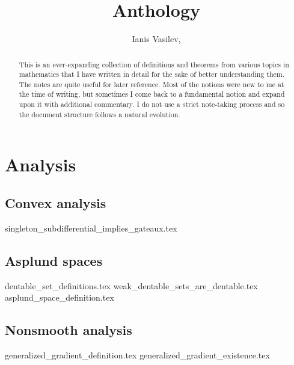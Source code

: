 \documentclass[numbers=endperiod, bibliography=totocnumbered]{scrartcl}
\title{Anthology}
\author{Ianis Vasilev, \Email{ianis@ivasilev.net}}
\date{}
\begin{document}
\maketitle

\begin{abstract}
  This is an ever-expanding collection of definitions and theorems from various topics in mathematics that I have written in detail for the sake of better understanding them. The notes are quite useful for later reference. Most of the notions were new to me at the time of writing, but sometimes I come back to a fundamental notion and expand upon it with additional commentary. I do not use a strict note-taking process and so the document structure follows a natural evolution.
\end{abstract}

\tableofcontents

\section{Analysis}
\subsection{Convex analysis}
{singleton_subdifferential_implies_gateaux.tex}

\subsection{Asplund spaces}
{dentable_set_definitions.tex}
{weak_dentable_sets_are_dentable.tex}
{asplund_space_definition.tex}

\subsection{Nonsmooth analysis}
{generalized_gradient_definition.tex}
{generalized_gradient_existence.tex}

\printbibliography
\end{document}
